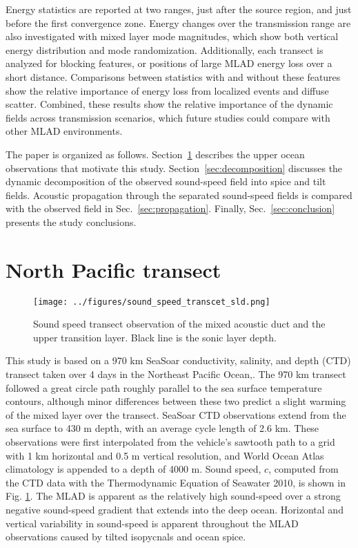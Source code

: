 \documentclass[preprint,NumberedRefs]{JASA}
\begin{document}
Energy statistics are reported at two ranges, just after the source region, and just before the first convergence zone. Energy changes over the transmission range are also investigated with mixed layer mode magnitudes, which show both vertical energy distribution and mode randomization. Additionally, each transect is analyzed for blocking features,\citep{colosi2020observations} or positions of large MLAD energy loss over a short distance. Comparisons between statistics with and without these features show the relative importance of energy loss from localized events and diffuse scatter. Combined, these results show the relative importance of the dynamic fields across transmission scenarios, which future studies could compare with other MLAD environments.

The paper is organized as follows. Section~\ref{sec:transcet} describes the upper ocean observations that motivate this study. Section~\ref{sec:decomposition} discusses the dynamic decomposition of the observed sound-speed field into spice and tilt fields. Acoustic propagation through the separated sound-speed fields is compared with the observed field in Sec.~\ref{sec:propagation}. Finally, Sec.~\ref{sec:conclusion} presents the study conclusions.

\section{North Pacific transect}\label{sec:transcet}
\begin{figure}
\texttt{[image: ../figures/sound\_speed\_transcet\_sld.png]}
\caption{\label{fig:c_grid}{Sound speed transect observation of the mixed acoustic duct and the upper transition layer. Black line is the sonic layer depth.}}
\end{figure}

This study is based on a 970 km SeaSoar conductivity, salinity, and depth (CTD) transect taken over 4 days in the Northeast Pacific Ocean,\citep{cole2010seasonal, colosi2020observations}. The 970 km transect followed a great circle path roughly parallel to the sea surface temperature contours, although minor differences between these two predict a slight warming of the mixed layer over the transect. SeaSoar CTD observations extend from the sea surface to 430 m depth, with an average cycle length of 2.6 km. These observations were first interpolated from the vehicle's sawtooth path to a grid with 1 km horizontal and 0.5 m vertical resolution,\citep{colosi2020observations} and World Ocean Atlas climatology is appended to a depth of 4000 m\citep{WOA}. Sound speed, $c$, computed from the CTD data with the Thermodynamic Equation of Seawater 2010,\cite{TEOS10} is shown in Fig. \ref{fig:c_grid}. The MLAD is apparent as the relatively high sound-speed over a strong negative sound-speed gradient that extends into the deep ocean. Horizontal and vertical variability in sound-speed is apparent throughout the MLAD observations caused by tilted isopycnals and ocean spice\citep{colosi2020observations}.
\end{document}

